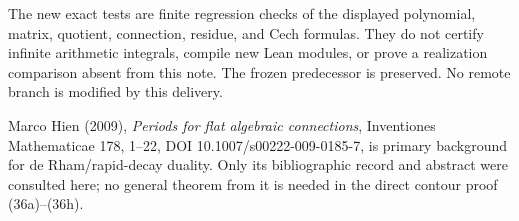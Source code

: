 The new exact tests are finite regression checks of the displayed polynomial, matrix, quotient, connection, residue, and Cech formulas. They do not certify infinite arithmetic integrals, compile new Lean modules, or prove a realization comparison absent from this note. The frozen predecessor is preserved. No remote branch is modified by this delivery.

Marco Hien (2009), \emph{Periods for flat algebraic connections}, Inventiones Mathematicae 178, 1--22, DOI 10.1007/s00222-009-0185-7, is primary background for de Rham/rapid-decay duality. Only its bibliographic record and abstract were consulted here; no general theorem from it is needed in the direct contour proof (36a)--(36h).
